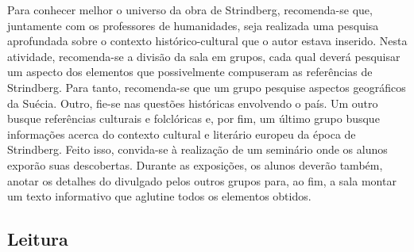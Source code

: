 \documentclass[12pt]{extarticle}
\begin{document}

Para conhecer melhor o universo da obra de Strindberg,
recomenda-se que, juntamente com os professores de humanidades, seja
realizada uma pesquisa aprofundada sobre o contexto histórico-cultural
que o autor estava inserido. Nesta atividade, recomenda-se a divisão da
sala em grupos, cada qual deverá pesquisar um aspecto dos elementos que
possivelmente compuseram as referências de Strindberg. Para tanto,
recomenda-se que um grupo pesquise aspectos geográficos da Suécia.
Outro, fie-se nas questões históricas envolvendo o país. Um outro busque
referências culturais e folclóricas e, por fim, um último grupo busque
informações acerca do contexto cultural e literário europeu da época de
Strindberg. Feito isso, convida-se à realização de um seminário onde os
alunos exporão suas descobertas. Durante as exposições, os alunos
deverão também, anotar os detalhes do divulgado pelos outros grupos
para, ao fim, a sala montar um texto informativo que aglutine todos os
elementos obtidos.

\subsection{Leitura}
\end{document}
